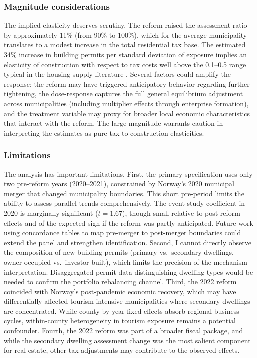 \documentclass[12pt]{article}
\begin{document}
\subsubsection*{Magnitude considerations} The implied elasticity deserves scrutiny. The reform raised the assessment ratio by approximately 11\% (from 90\% to 100\%), which for the average municipality translates to a modest increase in the total residential tax base. The estimated 34\% increase in building permits per standard deviation of exposure implies an elasticity of construction with respect to tax costs well above the 0.1--0.5 range typical in the housing supply literature \citep{saiz2010geographic}. Several factors could amplify the response: the reform may have triggered anticipatory behavior regarding further tightening, the dose-response captures the full general equilibrium adjustment across municipalities (including multiplier effects through enterprise formation), and the treatment variable may proxy for broader local economic characteristics that interact with the reform. The large magnitude warrants caution in interpreting the estimates as pure tax-to-construction elasticities.

\subsubsection*{Limitations} The analysis has important limitations. First, the primary specification uses only two pre-reform years (2020--2021), constrained by Norway's 2020 municipal merger that changed municipality boundaries. This short pre-period limits the ability to assess parallel trends comprehensively. The event study coefficient in 2020 is marginally significant ($t = 1.67$), though small relative to post-reform effects and of the expected sign if the reform was partly anticipated. Future work using concordance tables to map pre-merger to post-merger boundaries could extend the panel and strengthen identification. Second, I cannot directly observe the composition of new building permits (primary vs.\ secondary dwellings, owner-occupied vs.\ investor-built), which limits the precision of the mechanism interpretation. Disaggregated permit data distinguishing dwelling types would be needed to confirm the portfolio rebalancing channel. Third, the 2022 reform coincided with Norway's post-pandemic economic recovery, which may have differentially affected tourism-intensive municipalities where secondary dwellings are concentrated. While county-by-year fixed effects absorb regional business cycles, within-county heterogeneity in tourism exposure remains a potential confounder. Fourth, the 2022 reform was part of a broader fiscal package, and while the secondary dwelling assessment change was the most salient component for real estate, other tax adjustments may contribute to the observed effects.
\end{document}
